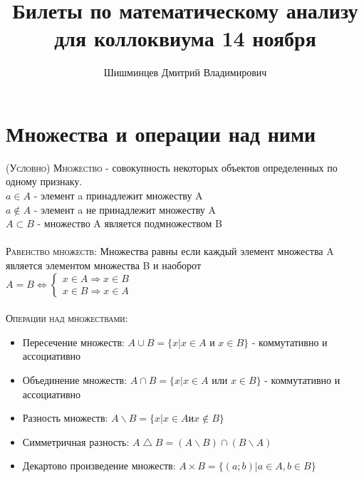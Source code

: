 \documentclass[14pt]{article}
\title{Билеты по математическому анализу для коллоквиума 14 ноября }
\author{Шишминцев Дмитрий Владимирович}
\begin{document}
    \maketitle
    \tableofcontents
    \newpage
    
    \section{Множества и операции над ними}
        \textsc{(Условно) Множество  }
         - совокупность некоторых объектов определенных по одному признаку. \\
        $ a \in A $ - элемент a принадлежит множеству A \\ 
        $ a \notin A $ - элемент a не принадлежит множеству A \\ 
        $ A \subset B $ - множество A является подмножеством B \\
        \\
        \textsc{Равенство множеств: } Множества равны если каждый элемент множества A является элементом множества B и наоборот \\
        $A = B \Leftrightarrow \begin{cases}
            x \in A \Rightarrow x \in B \\ 
            x \in B \Rightarrow x \in A
        \end{cases}$\\
        \\
        \textsc{Операции над множествами:}
        \begin{itemize}
            \item Пересечение множеств: $ A \cup B = \{ x| x \in A$ и $x \in B \}$ - коммутативно и ассоциативно
            \item Объединение множеств: $ A \cap B = \{ x | x \in A$ или $x \in B \}$ - коммутативно и ассоциативно
            \item Разность множеств: $ A \backslash B = \{ x | x \in A $и$ x \notin B \} $
            \item Симметричная разность: $ A \bigtriangleup B = (A \backslash B) \cap (B \backslash A)$
            \item Декартово произведение множеств: $ A \times B = \{(a; b) | a \in A, b \in B \}$
        \end{itemize}
           
\end{document}
